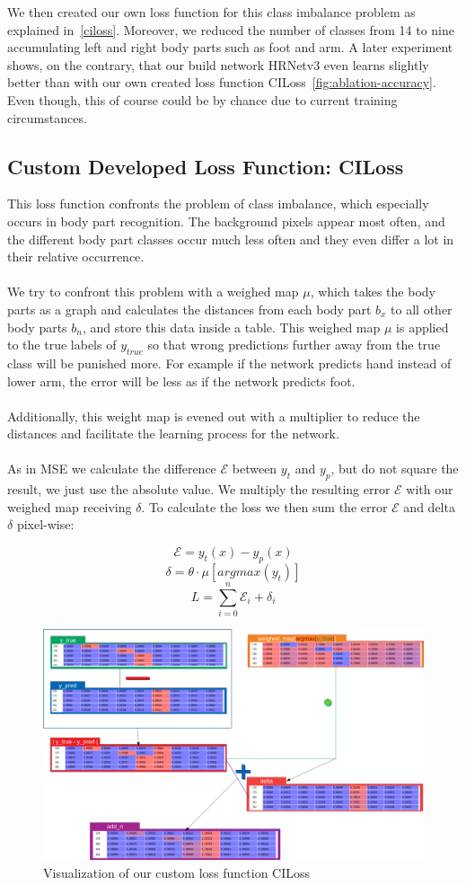 We then created our own loss function for this class imbalance problem as explained in~\autoref{ciloss}.
Moreover, we reduced the number of classes from 14 to nine accumulating left and right body parts such as foot and arm.
A later experiment shows, on the contrary, that our build network HRNetv3 even learns slightly better than with our own created
loss function CILoss~\ref{fig:ablation-accuracy}.
Even though, this of course could be by chance due to current training circumstances.


\subsection{Custom Developed Loss Function: CILoss}
\label{ciloss}
This loss function confronts the problem of class imbalance, which especially occurs in body part recognition.
The background pixels appear most often, and the different body part classes occur much less often and they even
differ a lot in their relative occurrence.
\\\mbox{}\\
We try to confront this problem with a weighed map $\mu$, which takes the body parts as a graph and calculates
the distances from each body part $b_x$ to all other body parts $b_n$, and store this data inside a table.
This weighed map $\mu$ is applied to the true labels of $y_{true}$ so that wrong predictions further away from the true
class will be punished more. For example if the network predicts hand instead of lower arm, the error will be less as if
the network predicts foot.
\\\mbox{}\\
Additionally, this weight map is evened out with a multiplier to reduce the distances and facilitate
the learning process for the network.
\\\mbox{}\\
As in MSE we calculate the difference $\mathcal{E}$ between $y_t$ and $y_p$, but do not square the result, we just use the absolute value.
We multiply the resulting error $\mathcal{E}$ with our weighed map receiving $\delta$.
To calculate the loss we then sum the error $\mathcal{E}$ and delta $\delta$ pixel-wise:

$$\mathcal{E}=y_t(x)-y_p(x)$$
$$\delta=\theta\cdot\mu[argmax(y_t)] $$
$$L=\sum_{i=0}^{n}\mathcal{E}_i+\delta_i$$


\begin{figure}[H]
    \centering
    \includegraphics[width=\textwidth,height=\textheight,keepaspectratio]{img/loss_calculation.png}
    \decoRule
    \caption[Loss Functions CILoss: Calculation]{Visualization of our custom loss function CILoss}
    \label{fig:ciloss-calc}
\end{figure}
